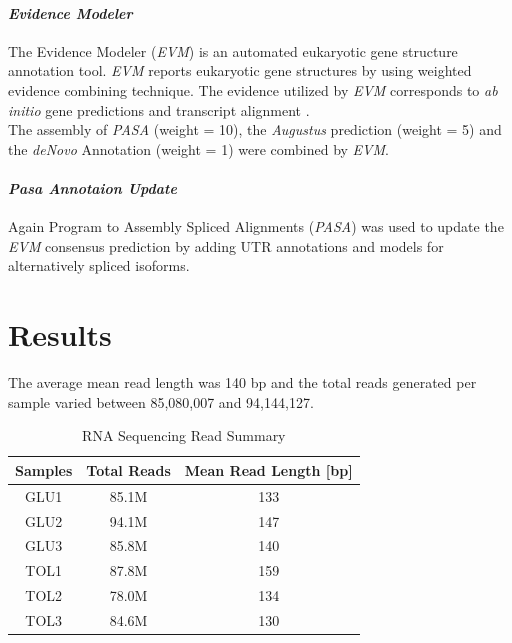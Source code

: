 \documentclass[12pt, a4paper]{report}
\begin{document}
\subsubsection{\textit{Evidence Modeler}}
The Evidence Modeler (\textit{EVM}) is an automated eukaryotic gene structure annotation tool. \textit{EVM} reports eukaryotic gene structures by using weighted evidence combining technique. The evidence utilized by \textit{EVM} corresponds to \textit{ab initio} gene predictions and transcript alignment \cite{Haas2008}.  \\
The assembly of \textit{PASA} (weight = 10), the \textit{Augustus} prediction (weight = 5) and the \textit{deNovo} Annotation (weight = 1) were combined by \textit{EVM}.

\subsubsection{\textit{Pasa Annotaion Update}}
Again Program to Assembly Spliced Alignments (\textit{PASA}) was used to update the \textit{EVM} consensus prediction by adding UTR annotations and models for alternatively spliced isoforms.


\newpage
\setcounter{chapter}{3}\setcounter{section}{0}
\chapter*{Results}
The average mean read length was 140 bp and the total reads generated per sample varied between 85,080,007 and 94,144,127. 
\begin{table}[H]
	\centering
	\begin{tabular}{|c|c|c|}
		\hline
		\textbf{Samples} & \textbf{Total Reads} & \textbf{Mean Read Length [bp]}  \\
		\hline
		GLU1 & 85.1M & 133 \\
		\hline
		GLU2 & 94.1M & 147  \\
		\hline
		GLU3 & 85.8M & 140  \\
		\hline
		TOL1 & 87.8M & 159  \\
		\hline
		TOL2 & 78.0M & 134  \\
		\hline
		TOL3 & 84.6M & 130  \\
		\hline
	\end{tabular}
	\caption{RNA Sequencing Read Summary}
\end{table}
\end{document}
